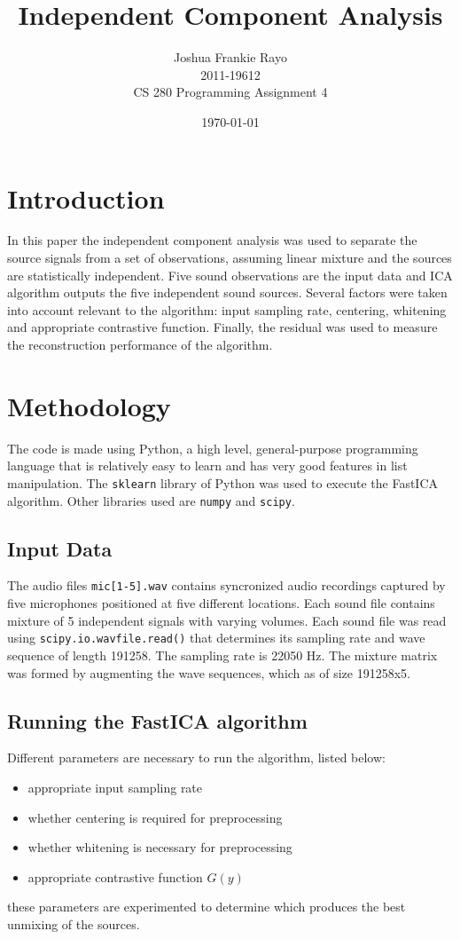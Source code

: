 \documentclass{article}
\title{Independent Component Analysis}
\author{Joshua Frankie Rayo\\2011-19612\\CS 280 Programming Assignment 4}
\date{\today}
\begin{document}
\maketitle
\tableofcontents

\section{Introduction}
	In this paper the independent component analysis was used to separate the source signals from a set of observations, assuming linear mixture and the sources are statistically independent. Five sound observations are the input data and ICA algorithm outputs the five independent sound sources. Several factors were taken into account relevant to the algorithm: input sampling rate, centering, whitening and appropriate contrastive function. Finally, the residual was used to measure the reconstruction performance of the algorithm.
\section{Methodology}
The code is made using Python, a high level, general-purpose programming language that is relatively easy to learn and has very good features in list manipulation. The \texttt{sklearn} library of Python was used to execute the FastICA algorithm. Other libraries used are \texttt{numpy} and \texttt{scipy}.

\subsection{Input Data}
The audio files \texttt{mic[1-5].wav} contains syncronized audio recordings captured by five microphones positioned at five different locations. Each sound file contains mixture of 5 independent signals with varying volumes. Each sound file was read using \texttt{scipy.io.wavfile.read()} that determines its sampling rate and wave sequence of length 191258. The sampling rate is 22050 Hz. The mixture matrix was formed by augmenting the wave sequences, which as of size 191258x5.

\subsection{Running the FastICA algorithm}
Different parameters are necessary to run the algorithm, listed below:
\begin{itemize}
	\item appropriate input sampling rate
	\item whether centering is required for preprocessing
	\item whether whitening is necessary for preprocessing
	\item appropriate contrastive function $G(y)$
\end{itemize}
these parameters are experimented to determine which produces the best unmixing of the sources.
\end{document}
